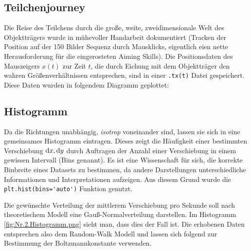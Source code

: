 
\subsection{Teilchenjourney}
Die Reise des Teilchens durch die große, weite, zweidimensionale Welt des Objektträgers wurde in mühevoller Handarbeit dokumentiert (Tracken der Position auf der 150 Bilder Sequenz durch Mausklicks, eigentlich eien nette Herausforderung für die eingerosteten Aiming Skills). Die Positionsdaten des Mauszeigers \(x(t)\) zur Zeit \(t\), die durch Eichung mit dem Objektträger den wahren Größenverhältnissen entsprechen, sind in einer \verb|.tx(t)| Datei gespeichert. Diese Daten wurden in folgendem Diagramm geplottet:
\FloatBarrier

\subsection{Histogramm}
Da die Richtungen unabhängig, \emph{isotrop} voneinander sind, lassen sie sich in eine gemeinsames Histogramm eintragen. Dieses zeigt die Häufigkeit einer bestimmten Verschiebung \(\mathop{}\!\mathrm{d} x,\mathop{}\!\mathrm{d} y\) durch Auftragen der Anzahl einer Verschiebung in einem gewissen Intervall (Bins genannt).
Es ist eine Wissenschaft für sich, die korrekte Binbreite eines Datasets zu bestimmen, da andere Darstellungen unterschiedliche Informationen und Interpretationen aufzeigen. Aus diesem Grund wurde die \verb|plt.hist(bins='auto')| Funktion genutzt. 

Die gewünschte Verteilung der mittlerem Verschiebung pro Sekunde soll nach theoretischem Modell eine Gauß-Normalverteilung darstellen. Im Histogramm \ref{fig:Nr.2.Histogramm.png} sieht man, dass dies der Fall ist. Die erhobenen Daten entsprechen also dem Random-Walk Modell und lassen sich folgend zur Bestimmung der Boltzmannkonstante verwenden. 
\FloatBarrier   

